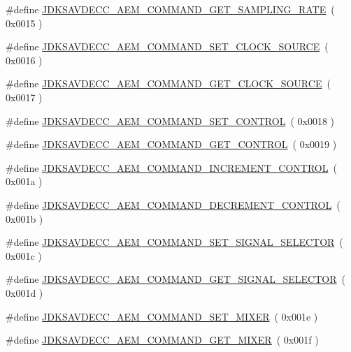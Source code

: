 \begin{DoxyCompactItemize}
\item 
\#define \hyperlink{group__command_ga42a1a73d69e78b1a9b5bbe7f24a85317}{J\+D\+K\+S\+A\+V\+D\+E\+C\+C\+\_\+\+A\+E\+M\+\_\+\+C\+O\+M\+M\+A\+N\+D\+\_\+\+G\+E\+T\+\_\+\+S\+A\+M\+P\+L\+I\+N\+G\+\_\+\+R\+A\+TE}~( 0x0015 )
\item 
\#define \hyperlink{group__command_ga058084a4e98b48f84b00c96f56130622}{J\+D\+K\+S\+A\+V\+D\+E\+C\+C\+\_\+\+A\+E\+M\+\_\+\+C\+O\+M\+M\+A\+N\+D\+\_\+\+S\+E\+T\+\_\+\+C\+L\+O\+C\+K\+\_\+\+S\+O\+U\+R\+CE}~( 0x0016 )
\item 
\#define \hyperlink{group__command_ga4d005d95910af9d509b33a7beba634d2}{J\+D\+K\+S\+A\+V\+D\+E\+C\+C\+\_\+\+A\+E\+M\+\_\+\+C\+O\+M\+M\+A\+N\+D\+\_\+\+G\+E\+T\+\_\+\+C\+L\+O\+C\+K\+\_\+\+S\+O\+U\+R\+CE}~( 0x0017 )
\item 
\#define \hyperlink{group__command_ga78648020206806d2992e010573f0ef27}{J\+D\+K\+S\+A\+V\+D\+E\+C\+C\+\_\+\+A\+E\+M\+\_\+\+C\+O\+M\+M\+A\+N\+D\+\_\+\+S\+E\+T\+\_\+\+C\+O\+N\+T\+R\+OL}~( 0x0018 )
\item 
\#define \hyperlink{group__command_ga5e5b22c644bac1a44abfda29f55bad47}{J\+D\+K\+S\+A\+V\+D\+E\+C\+C\+\_\+\+A\+E\+M\+\_\+\+C\+O\+M\+M\+A\+N\+D\+\_\+\+G\+E\+T\+\_\+\+C\+O\+N\+T\+R\+OL}~( 0x0019 )
\item 
\#define \hyperlink{group__command_ga58b798c5aff40aee5959100c1e5cfb75}{J\+D\+K\+S\+A\+V\+D\+E\+C\+C\+\_\+\+A\+E\+M\+\_\+\+C\+O\+M\+M\+A\+N\+D\+\_\+\+I\+N\+C\+R\+E\+M\+E\+N\+T\+\_\+\+C\+O\+N\+T\+R\+OL}~( 0x001a )
\item 
\#define \hyperlink{group__command_ga079ca63f4ae0e075007bd47311d694ec}{J\+D\+K\+S\+A\+V\+D\+E\+C\+C\+\_\+\+A\+E\+M\+\_\+\+C\+O\+M\+M\+A\+N\+D\+\_\+\+D\+E\+C\+R\+E\+M\+E\+N\+T\+\_\+\+C\+O\+N\+T\+R\+OL}~( 0x001b )
\item 
\#define \hyperlink{group__command_ga861ef72f5b6c20b056108c534bca1574}{J\+D\+K\+S\+A\+V\+D\+E\+C\+C\+\_\+\+A\+E\+M\+\_\+\+C\+O\+M\+M\+A\+N\+D\+\_\+\+S\+E\+T\+\_\+\+S\+I\+G\+N\+A\+L\+\_\+\+S\+E\+L\+E\+C\+T\+OR}~( 0x001c )
\item 
\#define \hyperlink{group__command_ga99a47e478155eac917d95362d3b40d10}{J\+D\+K\+S\+A\+V\+D\+E\+C\+C\+\_\+\+A\+E\+M\+\_\+\+C\+O\+M\+M\+A\+N\+D\+\_\+\+G\+E\+T\+\_\+\+S\+I\+G\+N\+A\+L\+\_\+\+S\+E\+L\+E\+C\+T\+OR}~( 0x001d )
\item 
\#define \hyperlink{group__command_gac853baece2ab649f0fa0b8d85250f4cc}{J\+D\+K\+S\+A\+V\+D\+E\+C\+C\+\_\+\+A\+E\+M\+\_\+\+C\+O\+M\+M\+A\+N\+D\+\_\+\+S\+E\+T\+\_\+\+M\+I\+X\+ER}~( 0x001e )
\item 
\#define \hyperlink{group__command_gae454972b887c09da98ad1aaf0b71e745}{J\+D\+K\+S\+A\+V\+D\+E\+C\+C\+\_\+\+A\+E\+M\+\_\+\+C\+O\+M\+M\+A\+N\+D\+\_\+\+G\+E\+T\+\_\+\+M\+I\+X\+ER}~( 0x001f )

\end{DoxyCompactItemize}
